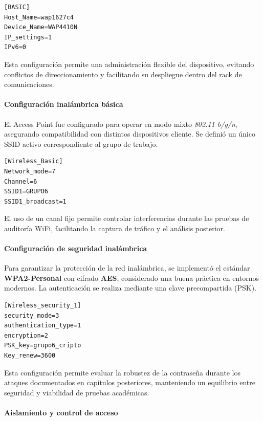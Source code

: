 \begin{lstlisting}[caption={Configuración básica de red del Access Point}]
[BASIC]
Host_Name=wap1627c4
Device_Name=WAP4410N
IP_settings=1
IPv6=0
\end{lstlisting}

Esta configuración permite una administración flexible del dispositivo, evitando conflictos de direccionamiento y facilitando su despliegue dentro del rack de comunicaciones.

\paragraph{Configuración inalámbrica básica}

El Access Point fue configurado para operar en modo mixto \textit{802.11 b/g/n}, asegurando compatibilidad con distintos dispositivos cliente. Se definió un único SSID activo correspondiente al grupo de trabajo.

\begin{lstlisting}[caption={Configuración inalámbrica básica}]
[Wireless_Basic]
Network_mode=7
Channel=6
SSID1=GRUPO6
SSID1_broadcast=1
\end{lstlisting}

El uso de un canal fijo permite controlar interferencias durante las pruebas de auditoría WiFi, facilitando la captura de tráfico y el análisis posterior.

\paragraph{Configuración de seguridad inalámbrica}

Para garantizar la protección de la red inalámbrica, se implementó el estándar \textbf{WPA2-Personal} con cifrado \textbf{AES}, considerado una buena práctica en entornos modernos. La autenticación se realiza mediante una clave precompartida (PSK).

\begin{lstlisting}[caption={Configuración de seguridad inalámbrica WPA2}]
[Wireless_security_1]
security_mode=3
authentication_type=1
encryption=2
PSK_key=grupo6_cripto
Key_renew=3600
\end{lstlisting}

Esta configuración permite evaluar la robustez de la contraseña durante los ataques documentados en capítulos posteriores, manteniendo un equilibrio entre seguridad y viabilidad de pruebas académicas.

\paragraph{Aislamiento y control de acceso}

